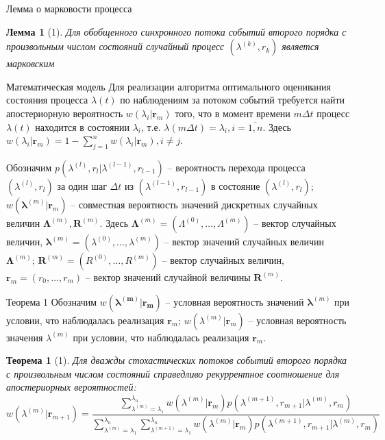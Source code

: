 \documentclass{beamer}
\newtheorem{rlemma}{Лемма}
\newtheorem{rtheo}{Теорема}
\begin{document}
\begin{frame}{Лемма о марковости процесса}
    \begin{rlemma}[1]
        Для обобщенного синхронного потока событий второго порядка с произвольным числом состояний случайный процесс \((\lambda^{(k)},r_k)\) является марковским
    \end{rlemma}
\end{frame}

\begin{frame}{Математическая модель}
    Для реализации алгоритма оптимального оценивания состояния процесса \(\lambda(t)\) по наблюдениям за потоком событий требуется найти апостериорную вероятность \(w(\lambda_i|\boldsymbol{r}_m)\) того, что в момент времени \(m\Delta t\) процесс \(\lambda(t)\) находится в состоянии \(\lambda_i\), т.е. \(\lambda(m\Delta t)=\lambda_i, i=\overline{1,n}\). Здесь \(w(\lambda_i|\boldsymbol{r}_m)=1-\sum_{j=1}^{n}w(\lambda_i|\boldsymbol{r}_m),i\ne j\). 
    \newline

    Обозначим \(p(\lambda^{(l)},r_l|\lambda^{(l-1)},r_{l-1})\) -- вероятность перехода процесса \((\lambda^{(l)},r_l)\) за один шаг \(\Delta t\) из \((\lambda^{(l-1)},r_{l-1})\) в состояние \((\lambda^{(l)},r_l)\); \(w(\boldsymbol{\lambda}^{(m)}|\boldsymbol{r}_m)\) -- совместная вероятность значений дискретных случайных величин \(\boldsymbol{\Lambda}^{(m)},\boldsymbol{R}^{(m)}\). Здесь \(\boldsymbol{\Lambda}^{(m)}=(\Lambda^{(0)},\dots,\Lambda^{(m)})\) -- вектор случайных величин, \(\boldsymbol{\lambda}^{(m)}=(\lambda^{(0)},\dots,\lambda^{(m)})\) -- вектор значений случайных величин \(\boldsymbol{\Lambda}^{(m)}\); \(\boldsymbol{R}^{(m)}=(R^{(0)},\dots,R^{(m)})\) -- вектор случайных величин,\(\boldsymbol{r}_m=(r_0,\dots,r_m)\) -- вектор значений случайной величины \(\boldsymbol{R}^{(m)}\). 
\end{frame}

\begin{frame}{Теорема 1}
    Обозначим \(w(\boldsymbol{\lambda^{(m)}|\boldsymbol{r}_m})\) -- условная вероятность значений \(\boldsymbol{\lambda}^{(m)}\) при условии, что наблюдалась реализация \(\boldsymbol{r}_m\); \(w(\lambda^{(m)}|\boldsymbol{r}_m)\) -- условная вероятность значения \(\lambda^{(m)}\) при условии, что наблюдалась реализация \(\boldsymbol{r}_m\).

    \begin{rtheo}[1]
    Для дважды стохастических потоков событий второго порядка с произвольным числом состояний справедливо рекуррентное соотношение для апостериорных вероятностей:
    \begin{equation}
        \scriptstyle w(\lambda^{(m)}|\boldsymbol{r}_{m+1})=\frac{\sum\limits_{\lambda^{(m)}=\lambda_1}^{\lambda_n}w(\lambda^{(m)}|\boldsymbol{r}_m)p(\lambda^{(m+1)},r_{m+1}|\lambda^{(m)},r_m)}{\sum\limits_{\lambda^{(m)}=\lambda_1}^{\lambda_n}\sum\limits_{\lambda^{(m+1)}=\lambda_1}^{\lambda_n}w(\lambda^{(m)}|\boldsymbol{r}_m)p(\lambda^{(m+1)},r_{m+1}|\lambda^{(m)},r_m)}
    \end{equation}
    \end{rtheo}
\end{frame}
\end{document}
